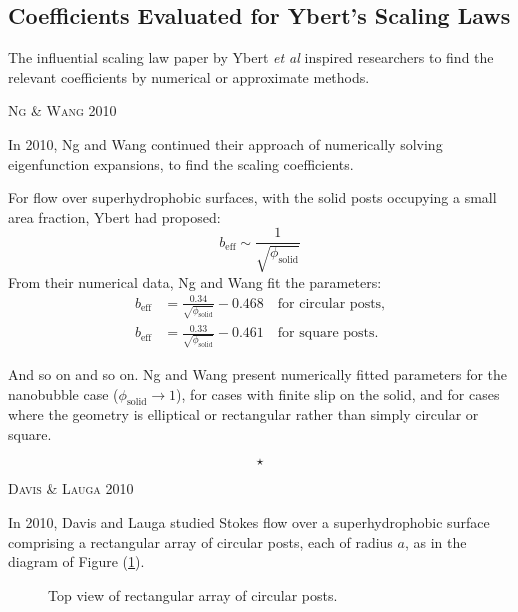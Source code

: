 \documentclass[12pt, a4paper, twoside, openright]{book}
\newcommand{\beff}{\ensuremath{b_{\mathrm{eff}}}}
\newcommand{\phisol}{\ensuremath{\phi_{\mathrm{solid}}}}
\newcommand{\sep}{\begin{equation*} \star \end{equation*}}
\newcommand{\paper}[1]
         {\colorbox[gray]{0.8}{ \textsc{#1}}
         
         }
\begin{document}
\subsection*{Coefficients Evaluated for Ybert's Scaling Laws}

The influential scaling law paper by Ybert \emph{et al} \cite{Ybert2007} inspired researchers to find the relevant coefficients by numerical or approximate methods.

\paper{Ng \& Wang 2010}
In 2010, Ng and Wang \cite{NgWang2010} continued their approach of numerically solving eigenfunction expansions, to find the scaling coefficients.

For flow over superhydrophobic surfaces, with the solid posts occupying a small area fraction, Ybert had proposed:
\begin{equation}
\beff \sim \frac{1}{\sqrt{\phisol}}
\end{equation}
From their numerical data, Ng and Wang fit the parameters:
\begin{align}
\beff &= \frac{0.34}{\sqrt{\phisol}} - 0.468 \quad \text{for circular posts,} \\
\beff &= \frac{0.33}{\sqrt{\phisol}} - 0.461 \quad \text{for square posts.}
\end{align}

And so on and so on.  Ng and Wang present numerically fitted parameters for the nanobubble case ($\phisol \rightarrow 1$), for cases with finite slip on the solid, and for cases where the geometry is elliptical or rectangular rather than simply circular or square.

\sep

\paper{Davis \& Lauga 2010}
In 2010, Davis and Lauga \cite{DavisLauga2010} studied Stokes flow over a superhydrophobic surface comprising a rectangular array of circular posts, each of radius $a$, as in the diagram of Figure (\ref{posts}).

\begin{figure}[ht]
\centering
{}
\caption{Top view of rectangular array of circular posts.}\label{posts}
\end{figure}
\end{document}
